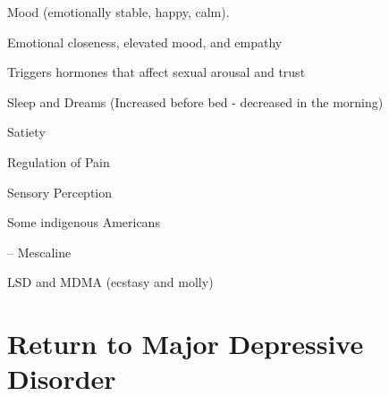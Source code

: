\begin{coloredlist}
    \item Mood (emotionally stable, happy, calm).
    \begin{coloredlist}
        \item Emotional closeness, elevated mood, and empathy
        \item Triggers hormones that affect sexual arousal and trust
    \end{coloredlist}
    \item Sleep and Dreams (Increased before bed - decreased in the morning)
    \item Satiety
    \item Regulation of Pain
    \item Sensory Perception
    \begin{coloredlist}
        \item Some indigenous Americans
        \begin{coloredlist}
            \item {} -- Mescaline
        \end{coloredlist}
        \item LSD and MDMA (ecstasy and molly)
    \end{coloredlist}
\end{coloredlist}

\section{Return to Major Depressive Disorder}

